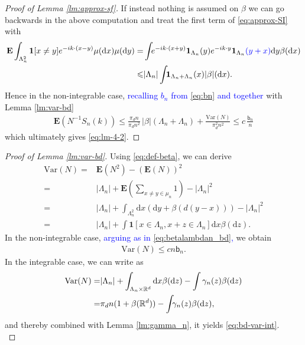 \documentclass[12pt]{article}
\newcommand{\bn}{   \mathsf b_{n}}
\newcommand{\1}{\mathbf{1}}
\newcommand{\md}{\mathrm{d}}
\newcommand{\var}{\text{Var}}
\newcommand{\dy}[1]{\textcolor{blue}{#1}}
\newcommand{\dy}[1]{#1}%
\begin{document}
{{{{{\begin{proof}[Proof of Lemma  \ref{lm:approx-sf}]
If instead nothing is assumed on $ \beta $ we can go backwards in the above computation and treat the first term of \eqref{eq:approx-SI} with
\begin{align}
\mathbf{E}  \int_{\Lambda_n^2}\1[x\neq y]e^{-ik \cdot (x - y)}\mu (\md x)\mu (\md y)  = & \int_{}e^{-i k \cdot (x+y)}\1_{\Lambda _{n}}(y)e^{-ik \cdot y}\1_{\Lambda _{n}}\dy{(y+x)}\md y\beta (\md x)  \nonumber \\
\leqslant & | \Lambda _{n} | \int_{}\1_{\Lambda _{n} + \Lambda _{n}}(x) | \beta |  (\md x). \label{eq:betalambdan_bd}
\end{align}
Hence in the non-integrable case, \dy{recalling $b_n$ from \eqref{eq:bn} and together} with Lemma  \ref{lm:var-bd}
\begin{align*}
\mathbf{E}(N^{-1}S_{n}(k))\leqslant \frac{\pi_d n}{\pi_dn^{2}} \, {|\beta|} (\Lambda _{n} + \Lambda _{n})+\frac{ \var(N)}{\pi_d^2 n^{2}}\leqslant  c \, \frac{\bn}{n}
\end{align*}
which ultimately gives \eqref{eq:lm-4-2}.
\end{proof}



\begin{proof}[Proof of Lemma  \ref{lm:var-bd}]
Using \eqref{eq:def-beta}, we can derive
\begin{align*}
\var(N)= &\mathbf{E}(N^{2})-(\mathbf{E}(N))^{2}\\
= &   | \Lambda _{n} |  +\mathbf{E}(\sum_{x\neq y\in \mu _{n}}1)- | \Lambda _{n} | ^{2}\\
= &  | \Lambda _{n} | +\int_{\Lambda _{n}^{2}}\md x(\md y+\beta (d(y-x)))- | \Lambda _{n} | ^{2}\\
= &   | \Lambda _{n} |  +\int \1[x\in \Lambda _{n},x + z\in \Lambda _{n}]\md x\beta (\md z).
\end{align*}
%
In the non-integrable case, \dy{arguing as in \eqref{eq:betalambdan_bd},} we obtain
%
\begin{align*}
\var(N)\leqslant cn \bn .
\end{align*}
%
In the integrable case, we can write as
%
\begin{align}\notag
\var(N)= & | \Lambda _{n} | +\int_{\Lambda _{n}\times \mathbb{R}^{d}}\md x\beta (\md z)-\int\gamma _{n}(z)\beta (\md z)\\
\label{eq:var-gamma-beta}= &\pi_d n(1+\beta (\mathbb{R}^{d}))-\int_{}\gamma _{n}(z)\beta (\md z),
\end{align}
%
and thereby combined with Lemma \ref{lm:gamma_n}, it yields  \eqref{eq:bd-var-int}. \\


\end{proof}}}}}}
\end{document}
